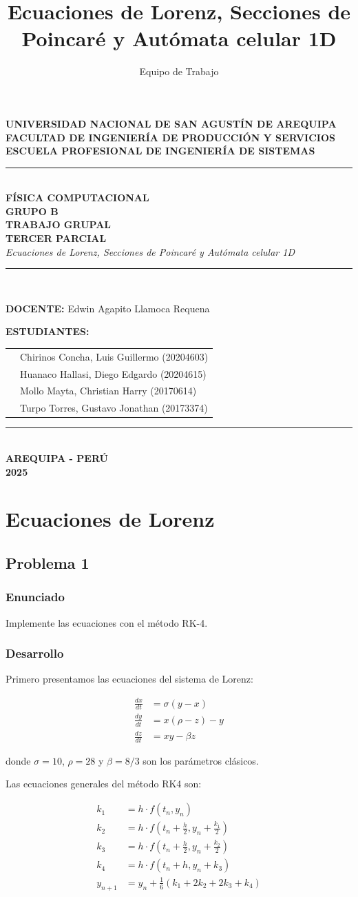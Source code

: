 \documentclass[a4paper,12pt]{article}
\theoremstyle{mytheor}
\renewcommand{\maketitle}{
\begin{titlepage}
\begin{center}

\vspace{1.5cm}

{\Large\textbf{UNIVERSIDAD NACIONAL DE SAN AGUSTÍN DE AREQUIPA}}\\[0.4cm]
{\large\textbf{FACULTAD DE INGENIERÍA DE PRODUCCIÓN Y SERVICIOS}}\\[0.3cm]
{\large\textbf{ESCUELA PROFESIONAL DE INGENIERÍA DE SISTEMAS}}\\[1.2cm]

\rule{0.75\textwidth}{1pt}\\[0.8cm]

{\Large\textbf{FÍSICA COMPUTACIONAL}}\\[0.3cm]
{\large\textbf{GRUPO B}}\\[1.2cm]

{\huge\textbf{TRABAJO GRUPAL}}\\[0.4cm]
{\Large\textbf{TERCER PARCIAL}}\\[0.5cm]
{\large\textit{Ecuaciones de Lorenz, Secciones de Poincaré y  Autómata celular 1D}}\\[1.5cm]

\rule{0.75\textwidth}{1pt}\\[0.8cm]

\begin{flushleft}
\hspace{3cm}\textbf{DOCENTE:} \hspace{2cm} Edwin Agapito Llamoca Requena
\end{flushleft}
\vspace{0.5cm}

\begin{flushleft}
\hspace{3cm}\textbf{ESTUDIANTES:}
\end{flushleft}
\vspace{0.3cm}

\begin{center}
\begin{tabular}{ll}
& Chirinos Concha, Luis Guillermo \hspace{1cm} (20204603) \\[0.2cm]
& Huanaco Hallasi, Diego Edgardo \hspace{1cm}  (20204615) \\[0.2cm]
& Mollo Mayta, Christian Harry \hspace{1.5cm}    (20170614) \\[0.2cm]
& Turpo Torres, Gustavo Jonathan \hspace{1cm}  (20173374) \\
\end{tabular}
\end{center}

\vfill

\rule{\textwidth}{1pt}\\[0.3cm]
{\Large\textbf{AREQUIPA - PERÚ}}\\
{\Large\textbf{2025}}

\end{center}
\end{titlepage}
}
\begin{document}
\title{Ecuaciones de Lorenz, Secciones de Poincaré y Autómata celular 1D}
\author{Equipo de Trabajo}

\maketitle

\tableofcontents
\newpage

\section{Ecuaciones de Lorenz}

\subsection{Problema 1}
\subsubsection{Enunciado}
Implemente las ecuaciones con el método RK-4.


\subsubsection{Desarrollo}
Primero presentamos las ecuaciones del sistema de Lorenz:

\begin{equation}
\begin{aligned}
\frac{dx}{dt} &= \sigma(y - x) \\
\frac{dy}{dt} &= x(\rho - z) - y \\
\frac{dz}{dt} &= xy - \beta z
\end{aligned}
\end{equation}

donde $\sigma = 10$, $\rho = 28$ y $\beta = 8/3$ son los parámetros clásicos.

Las ecuaciones generales del método RK4 son:

\begin{equation}
\begin{aligned}
k_1 &= h \cdot f(t_n, y_n) \\
k_2 &= h \cdot f\left(t_n + \frac{h}{2}, y_n + \frac{k_1}{2}\right) \\
k_3 &= h \cdot f\left(t_n + \frac{h}{2}, y_n + \frac{k_2}{2}\right) \\
k_4 &= h \cdot f(t_n + h, y_n + k_3) \\
y_{n+1} &= y_n + \frac{1}{6} (k_1 + 2k_2 + 2k_3 + k_4)
\end{aligned}
\end{equation}
\end{document}
